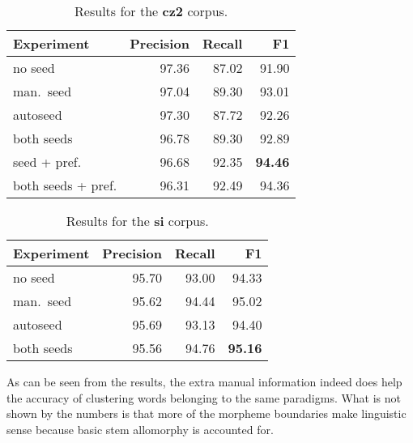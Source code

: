 \documentclass{itatnew}
\begin{document}
\begin{table}[h]
\begin{center}
\begin{tabular}{|l|r|r|r|}
\hline \bf Experiment & \bf Precision & \bf Recall & \bf F1\\ \hline
no seed & 97.36 & 87.02 & 91.90\\
man.~seed & 97.04 & 89.30 & 93.01 \\
autoseed & 97.30 & 87.72 & 92.26\\
both seeds & 96.78 & 89.30  & 92.89\\
seed + pref. & 96.68 & 92.35 & \bf 94.46\\
both seeds + pref. & 96.31 & 92.49 & 94.36\\
\hline
\end{tabular}
\end{center}
\caption{\label{table:res-cz2} Results for the \textbf{cz2} corpus.}
\end{table}

\begin{table}[h]
\begin{center}
\begin{tabular}{|l|r|r|r|}
\hline \bf Experiment & \bf Precision & \bf Recall & \bf F1\\ \hline
no seed & 95.70 & 93.00 & 94.33\\
man.~seed & 95.62 & 94.44 & 95.02 \\
autoseed & 95.69 & 93.13 & 94.40\\
both seeds & 95.56  & 94.76 & \bf 95.16\\
\hline
\end{tabular}
\end{center}
\caption{\label{table:res-si} Results for the \textbf{si} corpus.}
\end{table}

As can be seen from the results, the extra manual information indeed does help the accuracy of clustering words belonging to the same paradigms.
What is not shown by the numbers is that more of the morpheme boundaries make linguistic sense because basic stem allomorphy is accounted for. 
\end{document}
